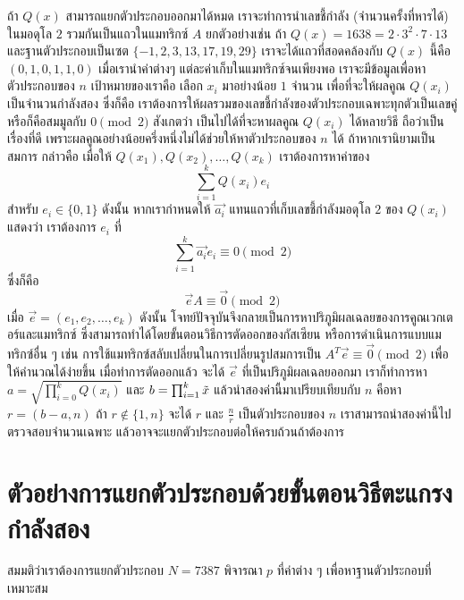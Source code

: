 \documentclass[20pt,a4paper]{article}
\begin{document}
ถ้า $Q(x)$ สามารถแยกตัวประกอบออกมาได้หมด เราจะทำการนำเลขชี้กำลัง (จำนวนครั้งที่หารได้) ในมอดุโล $2$ รวมกันเป็นแถวในแมทริกซ์ $A$ ยกตัวอย่างเช่น ถ้า $Q(x) = 1638 = 2 \cdot 3^2 \cdot 7 \cdot 13$ และฐานตัวประกอบเป็นเซต $\{-1,2,3,13,17,19,29\}$ เราจะได้แถวที่สอดคล้องกับ $Q(x)$ นี้คือ $(0,1,0,1,1,0)$ เมื่อเรานำค่าต่างๆ แต่ละค่าเก็บในแมทริกซ์จนเพียงพอ เราจะมีข้อมูลเพื่อหาตัวประกอบของ $n$
\vspace{4mm}
เป้าหมายของเราคือ เลือก $x_i$ มาอย่างน้อย $1$ จำนวน เพื่อที่จะให้ผลคูณ $Q(x_i)$ เป็นจำนวนกำลังสอง ซึ่งก็คือ เราต้องการให้ผลรวมของเลขชี้กำลังของตัวประกอบเฉพาะทุกตัวเป็นเลขคู่ หรือก็คือสมมูลกับ $0\pmod{2}$ สังเกตว่า เป็นไปได้ที่จะหาผลคูณ $Q(x_i)$ ได้หลายวิธี ถือว่าเป็นเรื่องที่ดี เพราะผลคูณอย่างน้อยครึ่งหนึ่งไม่ได้ช่วยให้หาตัวประกอบของ $n$ ได้
ถ้าหากเรานิยามเป็นสมการ กล่าวคือ เมื่อให้ $Q(x_1), Q(x_2), \dots, Q(x_k)$ เราต้องการหาค่าของ
\begin{equation*}
    \sum_{i=1}^{k} Q(x_i)e_i
\end{equation*}
สำหรับ $e_i \in \{0,1\}$ ดังนั้น หากเรากำหนดให้ $\vec{a_i}$ แทนแถวที่เก็บเลขชี้กำลังมอดุโล $2$ ของ $Q(x_i)$ แสดงว่า เราต้องการ $e_i$ ที่
\begin{equation*}
    \sum_{i=1}^{k} \vec{a_i}e_i \equiv 0 \pmod{2}
\end{equation*}
ซึ่งก็คือ
\begin{equation*}
    \vec{e}A \equiv \vec{0} \pmod{2}
\end{equation*}
เมื่อ $\vec{e} = (e_1,e_2,\dots,e_k)$ ดังนั้น โจทย์ปัจจุบันจึงกลายเป็นการหาปริภูมิผลเฉลยของการคูณเวกเตอร์และแมทริกซ์ ซึ่งสามารถทำได้โดยขั้นตอนวิธีการตัดออกของกัสเซียน หรือการดำเนินการแบบแมทริกซ์อื่น ๆ เช่น การใช้แมทริกซ์สลับเปลี่ยนในการเปลี่ยนรูปสมการเป็น $A^T\vec{e}\equiv\vec{0}\pmod{2}$ เพื่อให้คำนวณได้ง่ายขึ้น
\vspace{4mm}
เมื่อทำการตัดออกแล้ว จะได้ $\vec{e}$ ที่เป็นปริภูมิผลเฉลยออกมา เราก็ทำการหา $a =\sqrt{\prod_{i=0}^{k} Q(x_i)}$ และ $b = \prod_{i=1}^{k} \Tilde{x}$ แล้วนำสองค่านี้มาเปรียบเทียบกับ $n$ คือหา $r = (b-a,n)$ ถ้า $r \not\in \{1,n\}$ จะได้ $r$ และ $\frac{n}{r}$ เป็นตัวประกอบของ $n$ เราสามารถนำสองค่านี้ไปตรวจสอบจำนวนเฉพาะ แล้วอาจจะแยกตัวประกอบต่อให้ครบถ้วนถ้าต้องการ 
\section{ตัวอย่างการแยกตัวประกอบด้วยขั้นตอนวิธีตะแกรงกำลังสอง}
สมมติว่าเราต้องการแยกตัวประกอบ $N = 7387$ พิจารณา $p$ ที่ค่าต่าง ๆ เพื่อหาฐานตัวประกอบที่เหมาะสม
\end{document}
